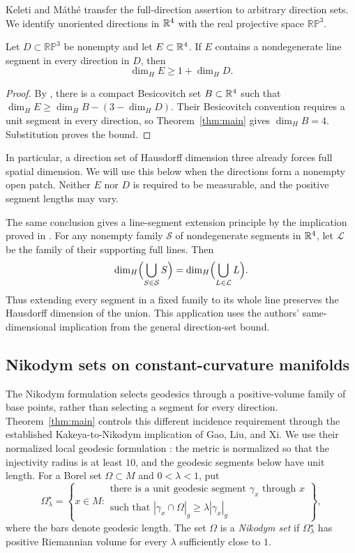 Keleti and M\'ath\'e transfer the full-direction assertion to arbitrary
direction sets. We identify unoriented directions in \(\mathbb R^4\) with
the real projective space \(\mathbb{RP}^3\).

\begin{corollary}
\label{cor:general-directions-four}
Let \(D\subset\mathbb{RP}^3\) be nonempty and let \(E\subset\mathbb R^4\).
If \(E\) contains a nondegenerate line segment in every direction
in \(D\), then
\[
 \dim_H E\ge1+\dim_H D.
\]
\end{corollary}
\begin{proof}
By \citet[Theorem~1.4]{KeletiMatheEquivalences}, there is a compact
Besicovitch set \(B\subset\mathbb R^4\) such that
\(\dim_H E\ge\dim_H B-(3-\dim_H D)\).
Their Besicovitch convention requires a unit segment in every
direction, so Theorem~\ref{thm:main} gives \(\dim_H B=4\).
Substitution proves the bound.
\end{proof}

In particular, a direction set of Hausdorff dimension three already
forces full spatial dimension. We will use this below when the
directions form a nonempty open patch. Neither \(E\) nor \(D\) is
required to be measurable, and the positive segment lengths may vary.

The same conclusion gives a line-segment extension principle by the
implication proved in \citet[Section~1.2]{KeletiMatheEquivalences}.
For any nonempty family \(\mathcal S\) of nondegenerate segments in
\(\mathbb R^4\), let \(\mathcal L\) be the family of their supporting full
lines. Then
\[
 \dim_H\Bigl(\bigcup_{S\in\mathcal S}S\Bigr)
 =\dim_H\Bigl(\bigcup_{L\in\mathcal L}L\Bigr).
\]
Thus extending every segment in a fixed family to its whole line
preserves the Hausdorff dimension of the union. This application uses
the authors' same-dimensional implication from the general
direction-set bound.

\subsection{Nikodym sets on constant-curvature manifolds}

The Nikodym formulation selects geodesics through a positive-volume
family of base points, rather than selecting a segment for every
direction. Theorem~\ref{thm:main} controls this different incidence
requirement through the established Kakeya-to-Nikodym implication of
Gao, Liu, and Xi. We use
their normalized local geodesic formulation
\citep[Definition~1.3 and Theorem~2.1]{GaoLiuXi2025}: the metric is
normalized so that the injectivity radius is at least \(10\), and the
geodesic segments below have unit length. For a Borel set
\(\Omega\subset M\) and \(0<\lambda<1\), put
\[
 \Omega_\lambda^\star
 =\left\{x\in M:
 \begin{array}{l}
 \text{there is a unit geodesic segment \(\gamma_x\) through \(x\)}\\
 \text{such that }|\gamma_x\cap\Omega|_g\ge
          \lambda|\gamma_x|_g
 \end{array}\right\},
\]
where the bars denote geodesic length. The set \(\Omega\) is a
\emph{Nikodym set} if \(\Omega_\lambda^\star\) has positive
Riemannian volume for every \(\lambda\) sufficiently close to \(1\).

